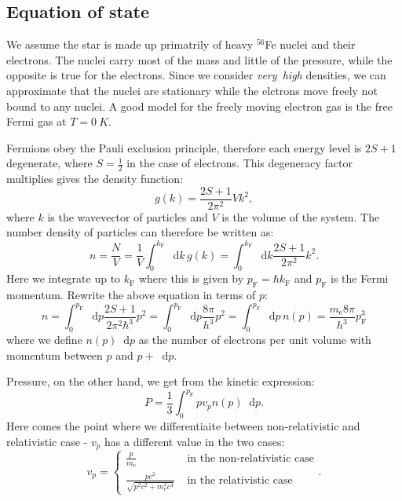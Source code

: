\documentclass[]{article}
\newcommand{\dd}{\mathop{}\!\mathrm{d}}
\newcommand{\fermiMtm}{p_\mathrm{F}}
\newcommand{\massElectron}{m_\mathrm{e}}
\begin{document}
\subsection{Equation of state}
	We assume the star is made up primatrily of heavy $^{56}$Fe nuclei and their electrons. The nuclei carry most of the mass and little of the pressure, while the opposite is true for the electrons. Since we consider \emph{very~high} densities, we can approximate that the nuclei are stationary while the elctrons move freely not bound to any nuclei. A good model for the freely moving electron gas is the free Fermi gas at $T = \SI{0}{K}$.

	Fermions obey the Pauli exclusion principle, therefore each energy level is $2S + 1$ degenerate, where $S = \frac{1}{2}$ in the case of electrons. This degeneracy factor multiplies gives the density function:
	\begin{equation}
		g(k) = \frac{2S + 1}{2 \pi^2} V k^2,
	\end{equation}
	where $k$ is the wavevector of particles and $V$ is the volume of the system. The number density of particles can therefore be written as:
	\begin{equation}
		n = \frac{N}{V} = \frac{1}{V} \int_0^{k_\mathrm{F}} \dd k \, g(k) = \int_0^{k_\mathrm{F}} \dd k \frac{2S + 1}{2 \pi^2} k^2.
	\end{equation}
	Here we integrate up to $k_\mathrm{F}$ where this is given by $\fermiMtm = \hbar k_\mathrm{F}$ and $\fermiMtm$ is the Fermi momentum. Rewrite the above equation in terms of $p$:
	\begin{equation}\label{eqn:number-density}
		n = \int_0^{\fermiMtm} \dd p \frac{2S + 1}{2 \pi^2 \hbar^3} p^2 = \int_0^{\fermiMtm} \dd p \frac{8 \pi}{h^3} p^2 = \int_0^{\fermiMtm} \dd p \, n(p) = \frac{\massElectron8 \pi}{h^3} \fermiMtm^3
	\end{equation}
	where we define $n(p) \dd p$ as the number of electrons per unit volume with momentum between $p$ and $p + \dd p$.

	Pressure, on the other hand, we get from the kinetic expression:
	\begin{equation}\label{eqn:pressure-int}
		P = \frac{1}{3} \int_0^{\fermiMtm} p v_p n(p) \dd p.
	\end{equation}
	Here comes the point where we differentiaite between non-relativistic and relativistic case - $v_p$ has a different value in the two cases:
	\begin{equation}
		v_p = \begin{cases}
			\frac{p}{\massElectron} & \text{ in the non-relativistic case} \\
			\frac{pc^2}{\sqrt{p^2c^2 + \massElectron^2 c^4}} & \text{ in the relativistic case}
		\end{cases}.
	\end{equation}
\end{document}
